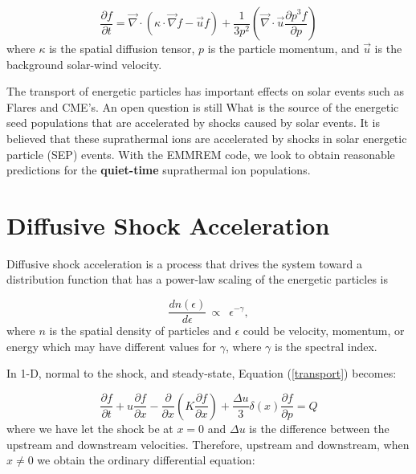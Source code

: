 \documentclass[%
 reprint,
 amsmath,amssymb,
 aps,
]{revtex4-1}
\begin{document}
\begin{equation} \label{transport}
\frac{\partial f}{\partial t} = \vec{\nabla} \cdot (\kappa \cdot \vec{\nabla} f - \vec{u} f) + \frac{1}{3 p^2} \left( \vec{\nabla} \cdot \vec{u} \frac{\partial p^3 f}{\partial p} \right)
\end{equation}
where $\kappa$ is the spatial diffusion tensor, $p$ is the particle momentum, and $\vec{u}$ is the background solar-wind velocity.

The transport of energetic particles has important effects on solar events such as Flares and CME's. An open question \cite{ISOISpaper} is still What is the source of the energetic seed populations that are accelerated by shocks caused by solar events. It is believed that these suprathermal ions are accelerated by shocks in solar energetic particle (SEP) events. With the EMMREM code, we look to obtain reasonable predictions for the \textbf{quiet-time} suprathermal ion populations.



\section{Diffusive Shock Acceleration}
Diffusive shock acceleration is a process that drives the system toward a distribution function that has a power-law scaling of the energetic particles is

\begin{equation}\label{powerlaw}
\frac{d n(\epsilon)}{d \epsilon} \, \propto \,\, \, \epsilon^{-\gamma},
\end{equation}
where $n$ is the spatial density of particles and $\epsilon$ could be velocity, momentum, or energy which may have different values for $\gamma$, where $\gamma$ is the spectral index. 

In 1-D, normal to the shock, and steady-state, Equation (\ref{transport}) becomes:

\begin{equation}\label{shockeqn}
\frac{\partial f}{\partial t} + u \frac{\partial f}{\partial x} - \frac{\partial}{\partial x} \left( K \frac{\partial f}{\partial x} \right) + \frac{\Delta u}{3} \delta (x) \frac{\partial f}{\partial p} = Q
\end{equation}
where we have let the shock be at $x = 0$ and $\Delta u$ is the difference between the upstream and downstream velocities. Therefore, upstream and downstream, when $x \neq 0$ we obtain the ordinary differential equation:
\end{document}
